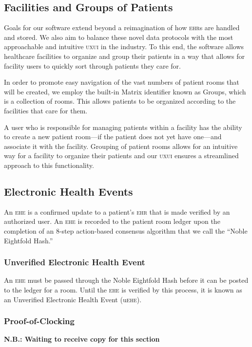 \subsection{Facilities and Groups of Patients}
Goals for our software extend beyond a reimagination of how \textsc{ehr}s are handled and stored. We also aim to balance these novel data protocols with the most approachable and intuitive \textsc{uxui} in the industry. To this end, the software allows healthcare facilities to organize and group their patients in a way that allows for facility users to quickly sort through patients they care for.%

In order to promote easy navigation of the vast numbers of patient rooms that will be created, we employ the built-in Matrix identifier known as Groups, which is a collection of rooms. This allows patients to be organized according to the facilities that care for them.%

A user who is responsible for managing patients within a facility has the ability to create a new patient room---if the patient does not yet have one---and associate it with the facility. Grouping of patient rooms allows for an intuitive way for a facility to organize their patients and our \textsc{uxui} ensures a streamlined approach to this functionality.%

\subsection{Electronic Health Events}
An \textsc{ehe} is a confirmed update to a patient's \textsc{ehr} that is made verified by an authorized user. An \textsc{ehe} is recorded to the patient room ledger upon the completion of an 8-step action-based consensus algorithm that we call the ``Noble Eightfold Hash.''%

  \subsubsection{Unverified Electronic Health Event}
  An \textsc{ehe} must be passed through the Noble Eightfold Hash before it can be posted to the ledger for a room. Until the \textsc{ehe} is verified by this process, it is known as an Unverified Electronic Health Event (u\textsc{ehe}).%

  \subsubsection{Proof-of-Clocking}
  \textbf{N.B.: Waiting to receive copy for this section}%


